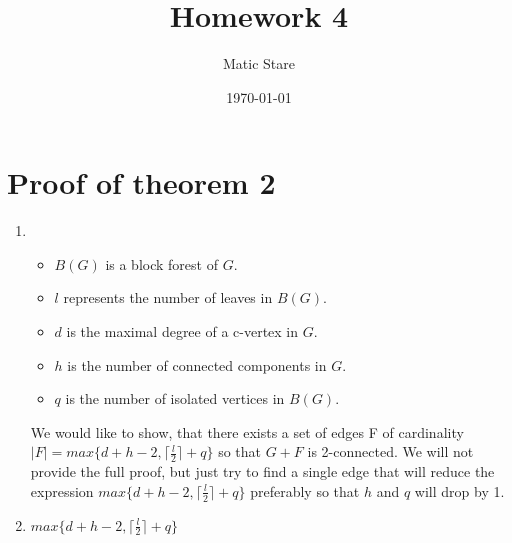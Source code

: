\documentclass{article}
\title{Homework 4}
\author{Matic Stare}
\date{\today}
\begin{document}
\maketitle

\tableofcontents
\newpage

\section{Proof of theorem 2}\label{sec:p1}

\begin{enumerate}[label*=\alph*)]
    \item 
    \begin{itemize}
        \item $B(G)$ is a block forest of $G$.
        \item $l$ represents the number of leaves in $B(G)$.
        \item $d$ is the maximal degree of a c-vertex in $G$.
        \item $h$ is the number of connected components in $G$.
        \item $q$ is the number of isolated vertices in $B(G)$.
    \end{itemize}
    We would like to show, that there exists a set of edges F of cardinality $|F| = max \{d + h - 2, \lceil \frac{l}{2} \rceil + q \}$ so that $G + F$ is 2-connected. We will not provide the full proof, but just try to find a single edge that will reduce the expression $max \{d + h - 2, \lceil \frac{l}{2} \rceil + q \}$ preferably so that $h$ and $q$ will drop by 1.

    

    \item  
        $max \{d + h - 2, \lceil \frac{l}{2} \rceil + q \}$
\end{enumerate}
\end{document}

